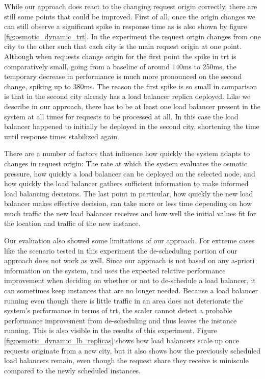 While our approach does react to the changing request origin correctly, there are still some points that could be improved.
First of all, once the origin changes we can still observe a significant spike in response time as is also shown by figure \ref{fig:osmotic_dynamic_trt}.
In the experiment the request origin changes from one city to the other such that each city is the main request origin at one point.
Although when requests change origin for the first point the spike in \gls{trt} is comparatively small, going from a baseline of around 140ms to 250ms, the temporary decrease in performance is much more pronounced on the second change, spiking up to 380ms.
The reason the first spike is so small in comparison is that in the second city already has a load balancer replica deployed.
Like we describe in our approach, there has to be at least one load balancer present in the system at all times for requests to be processed at all. 
In this case the load balancer happened to initially be deployed in the second city, shortening the time until response times stabilized again.

There are a number of factors that influence how quickly the system adapts to changes in request origin: The rate at which the system evaluates the osmotic pressure, how quickly a load balancer can be deployed on the selected node, and how quickly the load balancer gathers sufficient information to make informed load balancing decisions.
The last point in particular, how quickly the new load balancer makes effective decision, can take more or less time depending on how much traffic the new load balancer receives and how well the initial values fit for the location and traffic of the new instance.

Our evaluation also showed some limitations of our approach.
For extreme cases like the scenario tested in this experiment the de-scheduling portion of our approach does not work as well.
Since our approach is not based on any a-priori information on the system, and uses the expected relative performance improvement when deciding on whether or not to de-schedule a load balancer, it can sometimes keep instances that are no longer needed.
Because a load balancer running even though there is little traffic in an area does not deteriorate the system's performance in terms of \gls{trt}, the scaler cannot detect a probable performance improvement from de-scheduling and thus leaves the instance running. 
This is also visible in the results of this experiment.
Figure \ref{fig:osmotic_dynamic_lb_replicas} shows how load balancers scale up once requests originate from a new city, but it also shows how the previously scheduled load balancers remain, even though the request share they receive is miniscule compared to the newly scheduled instances.


